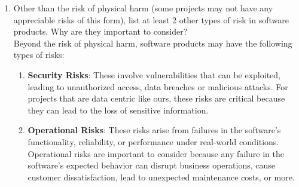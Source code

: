 \documentclass{article}
\begin{document}
\begin{enumerate}
    \item Other than the risk of physical harm (some projects may not have any
    appreciable risks of this form), list at least 2 other types of risk in
    software products. Why are they important to consider?\\

    Beyond the risk of physical harm, software products may have the following types of risks:
    \begin{enumerate}
      \item \textbf{Security Risks}: These involve vulnerabilities that can be exploited, leading to unauthorized access, data breaches
      or malicious attacks. For projects that are data centric like ours, these risks are critical because they can lead to the loss of
      sensitive information.
      \item \textbf{Operational Risks}: These risks arise from failures in the software's functionality, reliability, or performance under 
      real-world conditions. Operational risks are important to consider because any failure in the software’s expected behavior can disrupt 
      business operations, cause customer dissatisfaction, lead to unexpected maintenance costs, or more.
    \end{enumerate}
\end{enumerate}
\end{document}
